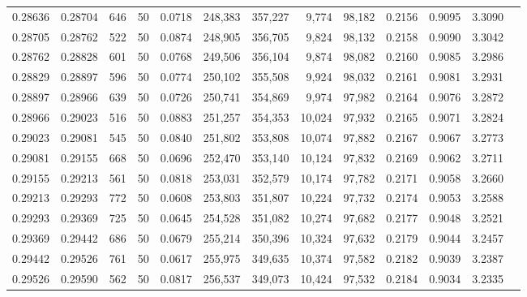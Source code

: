 \begin{tabular}{rrrrrrrrrrrrr}
0.28636 & 0.28704 &   646 &  50 &                                     0.0718 & 248,383 & 357,227 &   9,774 &  98,182 & 0.2156 & 0.9095 & 3.3090 \\
0.28705 & 0.28762 &   522 &  50 &                                     0.0874 & 248,905 & 356,705 &   9,824 &  98,132 & 0.2158 & 0.9090 & 3.3042 \\
0.28762 & 0.28828 &   601 &  50 &                                     0.0768 & 249,506 & 356,104 &   9,874 &  98,082 & 0.2160 & 0.9085 & 3.2986 \\
0.28829 & 0.28897 &   596 &  50 &                                     0.0774 & 250,102 & 355,508 &   9,924 &  98,032 & 0.2161 & 0.9081 & 3.2931 \\
0.28897 & 0.28966 &   639 &  50 &                                     0.0726 & 250,741 & 354,869 &   9,974 &  97,982 & 0.2164 & 0.9076 & 3.2872 \\
0.28966 & 0.29023 &   516 &  50 &                                     0.0883 & 251,257 & 354,353 &  10,024 &  97,932 & 0.2165 & 0.9071 & 3.2824 \\
0.29023 & 0.29081 &   545 &  50 &                                     0.0840 & 251,802 & 353,808 &  10,074 &  97,882 & 0.2167 & 0.9067 & 3.2773 \\
0.29081 & 0.29155 &   668 &  50 &                                     0.0696 & 252,470 & 353,140 &  10,124 &  97,832 & 0.2169 & 0.9062 & 3.2711 \\
0.29155 & 0.29213 &   561 &  50 &                                     0.0818 & 253,031 & 352,579 &  10,174 &  97,782 & 0.2171 & 0.9058 & 3.2660 \\
0.29213 & 0.29293 &   772 &  50 &                                     0.0608 & 253,803 & 351,807 &  10,224 &  97,732 & 0.2174 & 0.9053 & 3.2588 \\
0.29293 & 0.29369 &   725 &  50 &                                     0.0645 & 254,528 & 351,082 &  10,274 &  97,682 & 0.2177 & 0.9048 & 3.2521 \\
0.29369 & 0.29442 &   686 &  50 &                                     0.0679 & 255,214 & 350,396 &  10,324 &  97,632 & 0.2179 & 0.9044 & 3.2457 \\
0.29442 & 0.29526 &   761 &  50 &                                     0.0617 & 255,975 & 349,635 &  10,374 &  97,582 & 0.2182 & 0.9039 & 3.2387 \\
0.29526 & 0.29590 &   562 &  50 &                                     0.0817 & 256,537 & 349,073 &  10,424 &  97,532 & 0.2184 & 0.9034 & 3.2335 \\

\end{tabular}
